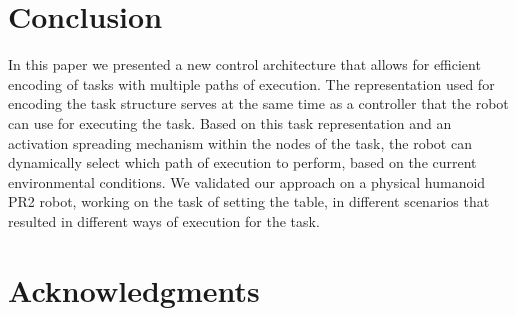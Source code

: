 \documentclass[conference]{article}
\begin{document}

\section{Conclusion}
\label{conclusion}
In this paper we presented a new control architecture that allows for efficient encoding of tasks with multiple paths of execution. The representation used for encoding the task structure serves at the same time as a controller that the robot can use for executing the task. Based on this task representation and an activation spreading mechanism within the nodes of the task, the robot can dynamically select which path of execution to perform, based on the current environmental conditions. We validated our approach on a physical humanoid PR2 robot, working on the task of setting the table, in different scenarios that resulted in different ways of execution for the task.
\section*{Acknowledgments}





\end{document}
